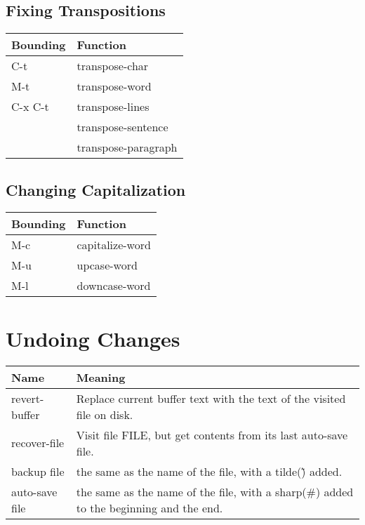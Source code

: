 \documentclass{book}
\newcommand{\head}[1]{\textnormal{\textbf{#1}}}
\begin{document}
\subsection{Fixing Transpositions}
\begin{tabular}{ll}
  \toprule[1.5pt]
  \head{Bounding} & \head{Function} \\
  \midrule
  C-t      & transpose-char      \\
  M-t      & transpose-word      \\
  C-x C-t  & transpose-lines     \\
                  & transpose-sentence  \\
                  & transpose-paragraph \\
  \bottomrule
\end{tabular}



\subsection{Changing Capitalization}
\begin{tabular}{ll}
  \toprule[1.5pt]
  \head{Bounding} & \head{Function} \\
  \midrule
  M-c      & capitalize-word \\
  M-u      & upcase-word     \\
  M-l      & downcase-word   \\
  \bottomrule
\end{tabular}


\section{Undoing Changes}
\begin{tabular}{ll}
  \toprule[1.5pt]
  \head{Name} & \head{Meaning} \\
  \midrule
  revert-buffer & Replace current buffer text with the text of the visited file on disk. \\
  recover-file  & Visit file FILE, but get contents from its last auto-save file.        \\
  backup file    & the same as the name of the file, with a tilde(\~) added.                              \\
  auto-save file & the same as the name of the file, with a sharp(\#) added to the beginning and the end. \\
  \bottomrule
\end{tabular}
\end{document}
